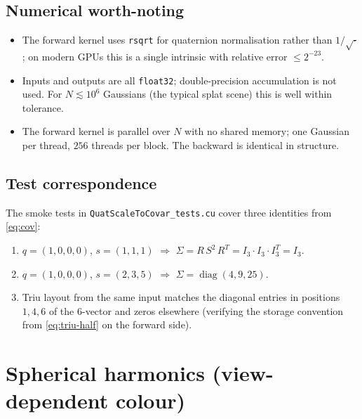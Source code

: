 \documentclass[11pt]{article}
\newcommand{\diag}{\operatorname{diag}}
\begin{document}
\subsection{Numerical worth-noting}

\begin{itemize}
  \item The forward kernel uses \texttt{rsqrt} for quaternion
  normalisation rather than $1 / \sqrt{\cdot}$; on modern GPUs this
  is a single intrinsic with relative error $\le 2^{-23}$.
  \item Inputs and outputs are all \texttt{float32}; double-precision
  accumulation is not used. For $N \lesssim 10^{6}$ Gaussians (the
  typical splat scene) this is well within tolerance.
  \item The forward kernel is parallel over $N$ with no shared
  memory; one Gaussian per thread, $256$ threads per block. The
  backward is identical in structure.
\end{itemize}

\subsection{Test correspondence}

The smoke tests in \texttt{QuatScaleToCovar\_tests.cu} cover three
identities from \eqref{eq:cov}:
\begin{enumerate}
  \item $q = (1, 0, 0, 0)$, $s = (1, 1, 1)$
  $\Longrightarrow$
  $\Sigma = R \, S^{2} \, R^{T} = I_{3} \cdot I_{3} \cdot I_{3}^{T} = I_{3}$.
  \item $q = (1, 0, 0, 0)$, $s = (2, 3, 5)$
  $\Longrightarrow$
  $\Sigma = \diag(4, 9, 25)$.
  \item Triu layout from the same input matches the diagonal entries
  in positions $1, 4, 6$ of the $6$-vector and zeros elsewhere
  (verifying the storage convention from \eqref{eq:triu-half} on the
  forward side).
\end{enumerate}

\section{Spherical harmonics (view-dependent colour)}
\label{sec:sh}
\end{document}
